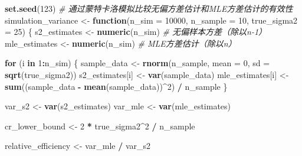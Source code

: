 \documentclass[
  twoside,12pt,fontset=none]{ctexbook}
\newenvironment{Shaded}{\begin{snugshade}}{\end{snugshade}}
\newcommand{\AttributeTok}[1]{\textcolor[rgb]{0.13,0.29,0.53}{#1}}
\newcommand{\CommentTok}[1]{\textcolor[rgb]{0.56,0.35,0.01}{\textit{#1}}}
\newcommand{\ControlFlowTok}[1]{\textcolor[rgb]{0.13,0.29,0.53}{\textbf{#1}}}
\newcommand{\DecValTok}[1]{\textcolor[rgb]{0.00,0.00,0.81}{#1}}
\newcommand{\FunctionTok}[1]{\textcolor[rgb]{0.13,0.29,0.53}{\textbf{#1}}}
\newcommand{\NormalTok}[1]{#1}
\newcommand{\OtherTok}[1]{\textcolor[rgb]{0.56,0.35,0.01}{#1}}
\newcommand{\SpecialCharTok}[1]{\textcolor[rgb]{0.81,0.36,0.00}{\textbf{#1}}}
\begin{document}
\begin{Shaded}
\begin{Highlighting}[]
\FunctionTok{set.seed}\NormalTok{(}\DecValTok{123}\NormalTok{)}
\CommentTok{\# 通过蒙特卡洛模拟比较无偏方差估计和MLE方差估计的有效性}
\NormalTok{simulation\_variance }\OtherTok{\textless{}{-}} \ControlFlowTok{function}\NormalTok{(}\AttributeTok{n\_sim =} \DecValTok{10000}\NormalTok{, }\AttributeTok{n\_sample =} \DecValTok{10}\NormalTok{,}
                                \AttributeTok{true\_sigma2 =} \DecValTok{25}\NormalTok{) \{}
\NormalTok{  s2\_estimates }\OtherTok{\textless{}{-}} \FunctionTok{numeric}\NormalTok{(n\_sim)  }\CommentTok{\# 无偏样本方差（除以n{-}1）}
\NormalTok{  mle\_estimates }\OtherTok{\textless{}{-}} \FunctionTok{numeric}\NormalTok{(n\_sim) }\CommentTok{\# MLE方差估计（除以n）}

  \ControlFlowTok{for}\NormalTok{ (i }\ControlFlowTok{in} \DecValTok{1}\SpecialCharTok{:}\NormalTok{n\_sim) \{}
\NormalTok{    sample\_data }\OtherTok{\textless{}{-}} \FunctionTok{rnorm}\NormalTok{(n\_sample, }\AttributeTok{mean =} \DecValTok{0}\NormalTok{, }\AttributeTok{sd =} \FunctionTok{sqrt}\NormalTok{(true\_sigma2))}
\NormalTok{    s2\_estimates[i] }\OtherTok{\textless{}{-}} \FunctionTok{var}\NormalTok{(sample\_data)}
\NormalTok{    mle\_estimates[i] }\OtherTok{\textless{}{-}} \FunctionTok{sum}\NormalTok{((sample\_data }\SpecialCharTok{{-}} \FunctionTok{mean}\NormalTok{(sample\_data))}\SpecialCharTok{\^{}}\DecValTok{2}\NormalTok{) }\SpecialCharTok{/}\NormalTok{ n\_sample}
\NormalTok{  \}}

\NormalTok{  var\_s2 }\OtherTok{\textless{}{-}} \FunctionTok{var}\NormalTok{(s2\_estimates)}
\NormalTok{  var\_mle }\OtherTok{\textless{}{-}} \FunctionTok{var}\NormalTok{(mle\_estimates)}

\NormalTok{  cr\_lower\_bound }\OtherTok{\textless{}{-}} \DecValTok{2} \SpecialCharTok{*}\NormalTok{ true\_sigma2}\SpecialCharTok{\^{}}\DecValTok{2} \SpecialCharTok{/}\NormalTok{ n\_sample}

\NormalTok{  relative\_efficiency }\OtherTok{\textless{}{-}}\NormalTok{ var\_mle }\SpecialCharTok{/}\NormalTok{ var\_s2}


\end{Highlighting}
\end{Shaded}
\end{document}
